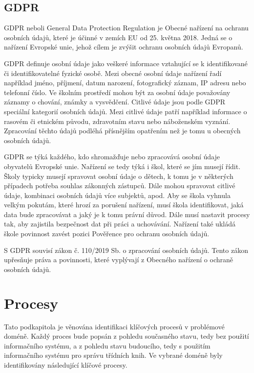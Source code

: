 \subsection{GDPR}
GDPR neboli General Data Protection Regulation je Obecné nařízení na ochranu osobních údajů, které je účinné v zemích EU od 25. května 2018. Jedná se o nařízení Evropské unie, jehož cílem je zvýšit ochranu osobních údajů Evropanů. \cite{uoou-gdpr}

GDPR definuje osobní údaje jako veškeré informace vztahující se k identifikované či identifikovatelné fyzické osobě. Mezi obecné osobní údaje nařízení řadí například jméno, příjmení, datum narození, fotografický záznam, IP adresu nebo telefonní číslo. Ve školním prostředí mohou být za osobní údaje považovány záznamy o chování, známky a vysvědčení. Citlivé údaje jsou podle GDPR speciální kategorií osobních údajů. Mezi citlivé údaje patří například informace o rasovém či etnickém původu, zdravotním stavu nebo náboženském vyznání. Zpracování těchto údajů podléhá přísnějším opatřením než je tomu u obecných osobních údajů. \cite{uoou-prirucka, gdpr-pro-ucitele}

GDPR se týká každého, kdo shromažďuje nebo zpracovává osobní údaje obyvatelů Evropské unie. Nařízení se tedy týká i škol, které se jím musejí řídit. Školy typicky musejí spravovat osobní údaje o dětech, k tomu je v některých případech potřeba souhlas zákonných zástupců. Dále mohou spravovat citlivé údaje, kombinaci osobních údajů více subjektů, apod. Aby se škola vyhnula velkým pokutám, které hrozí za porušení nařízení, musí škola identifikovat, jaká data bude zpracovávat a jaký je k tomu právní důvod. Dále musí nastavit procesy tak, aby zajistila bezpečnost dat při práci a uchovávání. Nařízení také ukládá škole povinnost zavést pozici Pověřence pro ochranu osobních údajů.~\cite{gdpr-ve-skolstvi}

S GDPR souvisí zákon č. 110/2019 Sb. o zpracování osobních údajů. Tento zákon upřesňuje práva a povinnosti, které vyplývají z Obecného nařízení o ochraně osobních údajů. \cite{epravo-osobni-udaje}


\section{Procesy}
Tato podkapitola je věnována identifikaci klíčových procesů v problémové doméně. Každý proces bude popsán z pohledu současného stavu, tedy bez použití informačního systému, a z pohledu stavu budoucího, tedy s použitím informačního systému pro správu třídních knih. Ve vybrané doméně byly identifikovány následující klíčové procesy.

